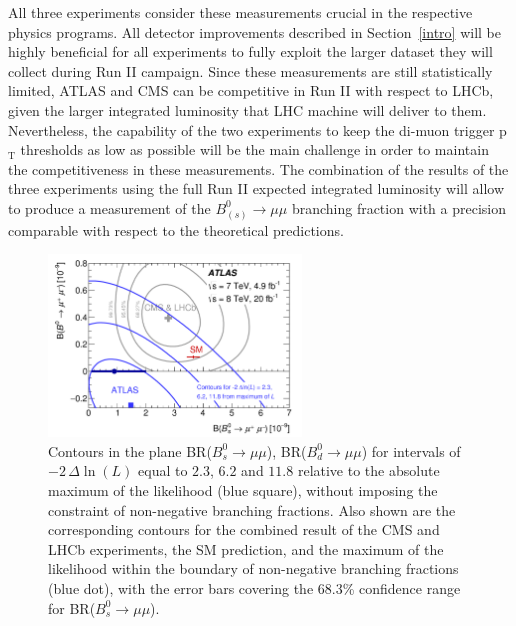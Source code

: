 All three experiments consider these measurements crucial in the respective physics programs. All detector improvements described in Section~\ref{intro} will be highly beneficial for all experiments to fully exploit the larger dataset they will collect during Run II campaign. Since these measurements are still statistically limited, ATLAS and CMS can be competitive in Run II with respect to LHCb, given the larger integrated luminosity that LHC machine will deliver to them. Nevertheless, the capability of the two experiments to keep the di-muon trigger p$_\mathrm{T}$ thresholds as low as possible will be the main challenge in order to maintain the competitiveness in these measurements. The combination of the results of the three experiments using the full Run II expected integrated luminosity will allow to produce a measurement of the $B^0_{(s)} \to \mu \mu$  branching fraction with a precision comparable with respect to the theoretical predictions.
\begin{figure}[!t]
  \begin{center}
    \includegraphics[width=0.6\textwidth]{fig_09.png}
    \caption
        {Contours in the plane  BR($B^0_s \to \mu \mu$), BR($B^0_d \to \mu \mu$) for intervals of
          $-2\, \Delta \ln(L)$ equal to $2.3$, $6.2$ and $11.8$ relative to the absolute maximum 
          of the likelihood (blue square), without imposing the constraint of non-negative branching fractions. 
          Also shown are the corresponding contours for the combined result of the CMS and LHCb 
          experiments, the SM prediction, and the maximum of the likelihood within the boundary of non-negative 
          branching fractions (blue dot), with the error bars covering the 68.3\% confidence range for BR($B^0_s \to \mu \mu$).}
        \label{fig:BsBd}
  \end{center}
\end{figure}

